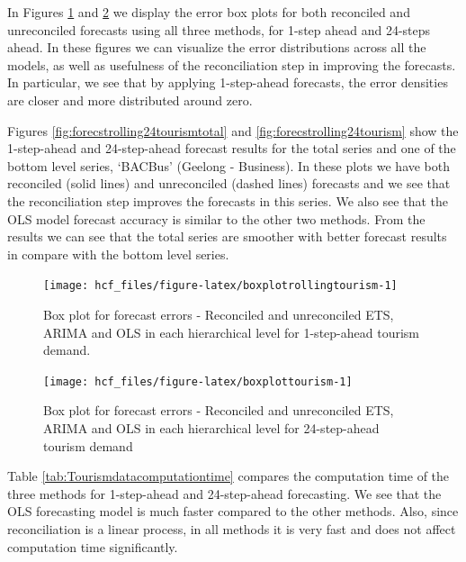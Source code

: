 \documentclass[11pt,a4paper,]{article}
\begin{document}
In Figures \ref{fig:boxplotrollingtourism} and \ref{fig:boxplottourism}
we display the error box plots for both reconciled and unreconciled
forecasts using all three methods, for 1-step ahead and 24-steps ahead.
In these figures we can visualize the error distributions across all the
models, as well as usefulness of the reconciliation step in improving
the forecasts. In particular, we see that by applying 1-step-ahead
forecasts, the error densities are closer and more distributed around
zero.

Figures \ref{fig:forecstrolling24tourismtotal} and
\ref{fig:forecstrolling24tourism} show the 1-step-ahead and
24-step-ahead forecast results for the total series and one of the
bottom level series, `BACBus' (Geelong - Business). In these plots we
have both reconciled (solid lines) and unreconciled (dashed lines)
forecasts and we see that the reconciliation step improves the forecasts
in this series. We also see that the OLS model forecast accuracy is
similar to the other two methods. From the results we can see that the
total series are smoother with better forecast results in compare with
the bottom level series.

\begin{figure}

{\centering \texttt{[image: hcf\_files/figure-latex/boxplotrollingtourism-1]} 

}

\caption{Box plot for forecast errors - Reconciled and unreconciled ETS, ARIMA and OLS in each hierarchical level for 1-step-ahead tourism demand.}\label{fig:boxplotrollingtourism}
\end{figure}

\begin{figure}

{\centering \texttt{[image: hcf\_files/figure-latex/boxplottourism-1]} 

}

\caption{Box plot for forecast errors - Reconciled and unreconciled ETS, ARIMA and OLS in each hierarchical level for 24-step-ahead tourism demand}\label{fig:boxplottourism}
\end{figure}

Table \ref{tab:Tourismdatacomputationtime} compares the computation time
of the three methods for 1-step-ahead and 24-step-ahead forecasting. We
see that the OLS forecasting model is much faster compared to the other
methods. Also, since reconciliation is a linear process, in all methods
it is very fast and does not affect computation time significantly.
\end{document}
